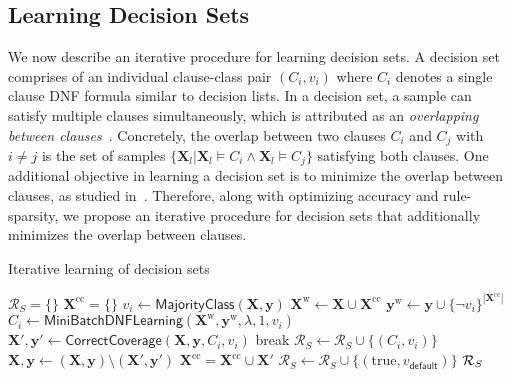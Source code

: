 \subsection{Learning Decision Sets}
We now describe an iterative procedure for learning decision sets. A decision set comprises of an individual clause-class  pair $ (C_i, v_i) $ where $ C_i $ denotes a single clause DNF formula similar to decision lists. In a decision set, a sample can satisfy multiple clauses simultaneously, which is attributed as an \textit{overlapping between clauses}~\cite{lakkaraju2016interpretable}. Concretely, the overlap between two clauses $ C_i $ and $ C_j $ with $ i \ne j $ is the set of samples $ \{\mathbf{X}_l | \mathbf{X}_l \models C_i \wedge \mathbf{X}_l \models C_j\} $ satisfying both clauses. One additional objective in learning a decision set is to minimize the overlap between clauses, as studied in~\cite{lakkaraju2016interpretable}. 
Therefore, along with optimizing accuracy and rule-sparsity, we propose an iterative procedure for decision sets that additionally minimizes the overlap between clauses.

\begin{algorithm}
	\caption{Iterative learning of decision sets}
	\label{interpretability_imli_algo:iterative_decision_sets_learning}
	\begin{algorithmic}[1]
		\State $ \mathcal{R}_S=\{\} $
		\State $ \mathbf{X}^\text{cc} = \{\}$  
		\State $ v_i \leftarrow \mathsf{MajorityClass(\mathbf{X},\mathbf{y})} $
		\State $ \mathbf{X}^\text{w} \leftarrow \mathbf{X} \cup \mathbf{X}^\text{cc} $ 
		\State $ \mathbf{y}^\text{w} \leftarrow  \mathbf{y} \cup  \{\neg v_i\}^{|\mathbf{X}^\text{cc}|}$ 
		\State $ C_i \leftarrow \mathsf{MiniBatchDNFLearning}( \mathbf{X}^\text{w},\mathbf{y}^\text{w},\lambda, 1, v_i) $ 
		\State $ \mathbf{X}',\mathbf{y}' \leftarrow \mathsf{CorrectCoverage}(\mathbf{X}, \mathbf{y}, C_i, v_i) $
		\State break
		\EndIf
		\State $ \mathcal{R}_S \leftarrow \mathcal{R}_S \cup \{(C_i, v_i)\} $
		\State $ \mathbf{X},\mathbf{y} \leftarrow (\mathbf{X},\mathbf{y})  \setminus (\mathbf{X}',\mathbf{y}') $
		\State $ \mathbf{X}^\text{cc} = \mathbf{X}^\text{cc} \cup \mathbf{X}'$ 
		\EndFor
		\State $ \mathcal{R}_S \leftarrow \mathcal{R}_S  \cup \{(\text{true}, v_{\mathsf{default}} )\}$
		\State \Return $ {\mathcal{R}}_S $
		\EndProcedure
	\end{algorithmic}
\end{algorithm} 






